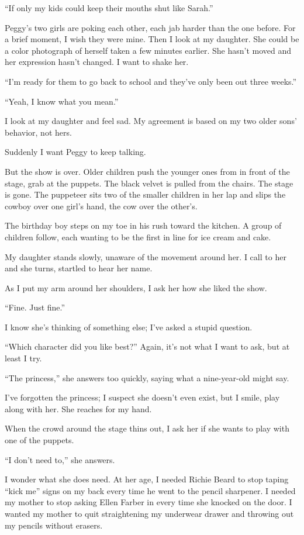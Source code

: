 \documentclass[
]{article}
\begin{document}
``If only my kids could keep their mouths shut like Sarah.''

Peggy's two girls are poking each other, each jab harder than the one
before. For a brief moment, I wish they were mine. Then I look at my
daughter. She could be a color photograph of herself taken a few minutes
earlier. She hasn't moved and her expression hasn't changed. I want to
shake her.

``I'm ready for them to go back to school and they've only been out
three weeks.''

``Yeah, I know what you mean.''

I look at my daughter and feel sad. My agreement is based on my two
older sons' behavior, not hers.

Suddenly I want Peggy to keep talking.

But the show is over. Older children push the younger ones from in front
of the stage, grab at the puppets. The black velvet is pulled from the
chairs. The stage is gone. The puppeteer sits two of the smaller
children in her lap and slips the cowboy over one girl's hand, the cow
over the other's.

The birthday boy steps on my toe in his rush toward the kitchen. A group
of children follow, each wanting to be the first in line for ice cream
and cake.

My daughter stands slowly, unaware of the movement around her. I call to
her and she turns, startled to hear her name.

As I put my arm around her shoulders, I ask her how she liked the show.

``Fine. Just fine.''

I know she's thinking of something else; I've asked a stupid question.

``Which character did you like best?'' Again, it's not what I want to
ask, but at least I try.

``The princess,'' she answers too quickly, saying what a nine-year-old
might say.

I've forgotten the princess; I suspect she doesn't even exist, but I
smile, play along with her. She reaches for my hand.

When the crowd around the stage thins out, I ask her if she wants to
play with one of the puppets.

``I don't need to,'' she answers.

I wonder what she does need. At her age, I needed Richie Beard to stop
taping ``kick me'' signs on my back every time he went to the pencil
sharpener. I needed my mother to stop asking Ellen Farber in every time
she knocked on the door. I wanted my mother to quit straightening my
under­wear drawer and throwing out my pencils without erasers.
\end{document}
